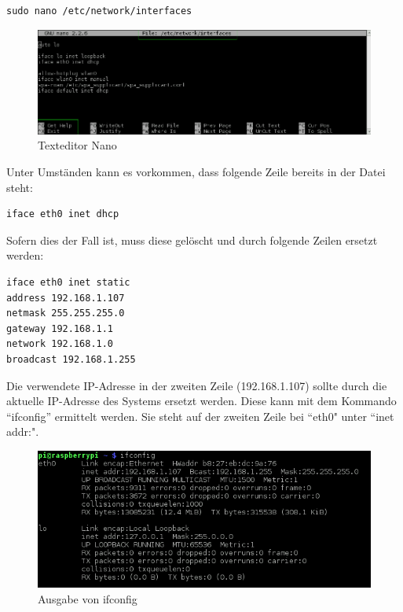 \begin{lstlisting}
sudo nano /etc/network/interfaces
\end{lstlisting} 

\begin{figure}[h]
\centering
\includegraphics[scale=0.6]{images/nano}
\caption{Texteditor Nano}
\end{figure}

Unter Umständen kann es vorkommen, dass folgende Zeile bereits in der Datei steht:

\begin{lstlisting}
iface eth0 inet dhcp
\end{lstlisting}

Sofern dies der Fall ist, muss diese gelöscht und durch folgende Zeilen ersetzt werden:

\begin{lstlisting}
iface eth0 inet static
address 192.168.1.107
netmask 255.255.255.0
gateway 192.168.1.1
network 192.168.1.0
broadcast 192.168.1.255
\end{lstlisting}

Die verwendete IP-Adresse in der zweiten Zeile (192.168.1.107) sollte durch die aktuelle IP-Adresse des Systems ersetzt werden. Diese kann mit dem Kommando ``ifconfig'' ermittelt werden. Sie steht auf der zweiten Zeile bei ``eth0" unter ``inet addr:".

\begin{figure}[h]
\centering
\includegraphics[scale=0.65]{images/ifconfig}
\caption{Ausgabe von ifconfig}
\end{figure}

